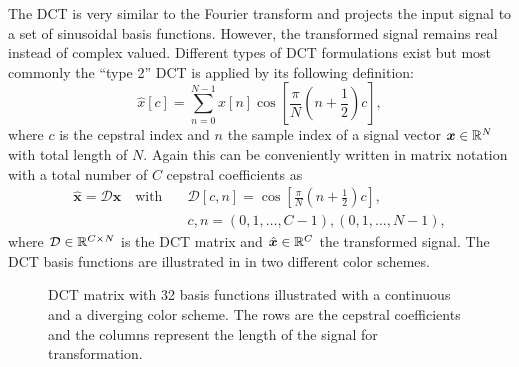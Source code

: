 The DCT is very similar to the Fourier transform and projects the input signal to a set of sinusoidal basis functions. 
However, the transformed signal remains real instead of complex valued.
Different types of DCT formulations exist but most commonly the \enquote{type 2} DCT is applied by its following definition:
\begin{equation}\label{eq:signal_mfcc_dct}
  \hat{x}[c] = \sum_{n=0}^{N-1} x[n] \cos{\left[ \frac{\pi}{N} \left( n + \frac{1}{2} \right) c \right]},
\end{equation}
where $c$ is the cepstral index and $n$ the sample index of a signal vector $\bm{x} \in \mathbb{R}^N$ with total length of $N$.
Again this can be conveniently written in matrix notation with a total number of $C$ cepstral coefficients as
\begin{equation}\label{eq:signal_mfcc_dct_matrix}
  \begin{aligned}
    \hat{\bm{x}} = \mathcal{D} \bm{x} \quad \mathrm{with} 
    \quad &\mathcal{D}[c, n] = \cos{\left[ \frac{\pi}{N} \left( n + \frac{1}{2} \right) c  \right]},\\
    &c, n = (0, 1, \dots, C - 1), (0, 1, \dots, N - 1),
  \end{aligned}
\end{equation}
where $\mathcal{D} \in \mathbb{R}^{C \times N}$ is the DCT matrix and $\hat{\bm{x}} \in \mathbb{R}^C$ the transformed signal.
The DCT basis functions are illustrated in  in two different color schemes.
\begin{figure}[!ht]
  \centering
  \qquad
  \caption{DCT matrix with 32 basis functions illustrated with a continuous and a diverging color scheme. The rows are the cepstral coefficients and the columns represent the length of the signal for transformation.}
  \label{fig:signal_mfcc_dct}
\end{figure}
